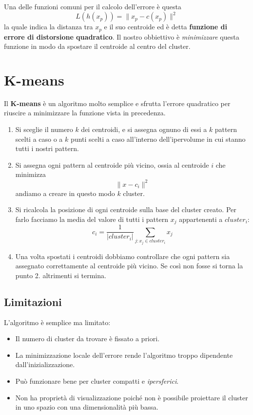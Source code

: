 Una delle funzioni comuni per il calcolo dell'errore \`e questa
\[ L(h(x_p)) = \| x_p - c(x_p) \|^2 \]
la quale indica la distanza tra $x_p$ e il suo centroide ed \`e detta \textbf{funzione di errore di distorsione quadratico}.
Il nostro obbiettivo \`e \emph{minimizzare} questa funzione in modo da spostare il centroide al centro del cluster.

\section{K-means}
Il \textbf{K-means} \`e un algoritmo molto semplice e sfrutta l'errore quadratico per riuscire a minimizzare la funzione
vista in precedenza.
\begin{enumerate}
	\item Si sceglie il numero $k$ dei centroidi, e si assegna ognuno di essi a $k$ pattern scelti a caso o a $k$ punti
	      scelti a caso all'interno dell'ipervolume in cui stanno tutti i nostri pattern.
	\item Si assegna ogni pattern al centroide pi\`u vicino, ossia al centroide $i$ che minimizza
	      \[ \| x - c_i \|^2 \]
	      andiamo a creare in questo modo $k$ cluster.
	\item Si ricalcola la posizione di ogni centroide sulla base del cluster creato. Per farlo facciamo la media del
	      valore di tutti i pattern $x_j$ appartenenti a $cluster_i$:
	      \[ c_i = \frac{1}{|cluster_i|} \sum_{j : x_j \in cluster_i} x_j \]
	\item Una volta spostati i centroidi dobbiamo controllare che ogni pattern sia assegnato correttamente al centroide
	      pi\`u vicino. Se cos\`i non fosse si torna la punto 2. altrimenti si termina.
\end{enumerate}

\subsection*{Limitazioni}
L'algoritmo \`e semplice ma limitato:
\begin{itemize}
	\item Il numero di cluster da trovare \`e fissato a priori.
	\item La minimizzazione locale dell'errore rende l'algoritmo troppo dipendente dall'inizializzazione.
	\item Pu\`o funzionare bene per cluster compatti e \emph{ipersferici}.
	\item Non ha propriet\`a di visualizzazione poich\'e non \`e possibile proiettare il cluster in uno spazio con una
	      dimensionalit\`a pi\`u bassa.
\end{itemize}

